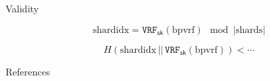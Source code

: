 \documentclass[final]{beamer}
\newlength{\onecolwid}
\begin{document}
\begin{frame}[t]
\begin{columns}[t]
\begin{column}{\onecolwid}
\begin{block}{Validity}
\newcommand{\sk}{\ensuremath{\mathsf{sk}}} %
\newcommand{\pv}{\ensuremath{\mathcal{P}V}}
\newcommand{\V}{\ensuremath{\mathcal{V}}}
\newcommand{\vcheck}{\ensuremath{\#V\mathsf{check}}} %

\begin{equation}
\mathrm{shardidx} = \mathtt{VRF}_{\sk}(\mathrm{bpvrf}) \mod |\mathrm{shards}|
\end{equation}

\begin{equation}
H(\mathrm{shardidx} \, || \, \mathtt{VRF}_{\sk}(\mathrm{bpvrf})) < \cdots
\end{equation}


\end{block}


%


\begin{block}{References}

\nocite{*} %
\small{
\vspace{0.75in}}

\end{block}






\end{column}
\end{columns}
\end{frame}
\end{document}
